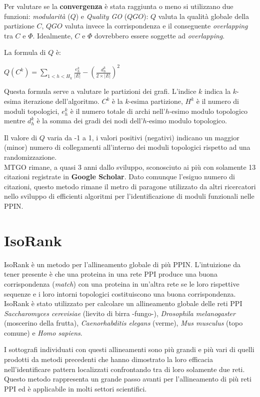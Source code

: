 \documentclass[11pt]{article}
\begin{document}
Per valutare se la \textbf{convergenza} è stata raggiunta o meno si utilizzano due funzioni: \textit{modularità} ($Q$) e \textit{Quality GO} ($QGO$): $Q$ valuta la qualità globale della partizione $C$, $QGO$ valuta invece la corrispondenza e il conseguente \textit{overlapping} tra $C$ e $\Phi$. Idealmente, $C$ e $\Phi$ dovrebbero essere soggette ad \textit{overlapping}.

La formula di $Q$ è:

\begin{center}
$Q(C^k) = \displaystyle{\sum_{1<h<H_k}\frac{e^k_h}{|E|} - \left(\frac{d^k_h}{2 \times |E|}\right)^2}$
\end{center}

Questa formula serve a valutare le partizioni dei grafi. L'indice $k$ indica la $k$-esima iterazione dell'algoritmo. $C^k$ è la $k$-esima partizione, $H^k$ è il numero di moduli topologici, $e^k_h$ è il numero totale di archi nell'$h$-esimo modulo topologico mentre $d^k_h$ è la somma dei gradi dei nodi dell'$h$-esimo modulo topologico. 

Il valore di $Q$ varia da -1 a 1, i valori positivi (negativi) indicano un maggior (minor) numero di collegamenti all'interno dei moduli topologici rispetto ad una randomizzazione.\\

MTGO rimane, a quasi 3 anni dallo sviluppo, sconosciuto ai più con solamente 13 citazioni registrate in \textbf{Google Scholar}. Dato comunque l'esiguo numero di citazioni, questo metodo rimane il metro di paragone utilizzato da altri ricercatori nello sviluppo di efficienti algoritmi per l'identificazione di moduli funzionali nelle PPIN.

\pagebreak
\section{IsoRank}
IsoRank è un metodo per l'allineamento globale di più PPIN. L'intuizione da tener presente è che una proteina in una rete PPI produce una buona corrispondenza (\textit{match}) con una proteina in un'altra rete se le loro rispettive sequenze e i loro intorni topologici costituiscono una buona corrispondenza. IsoRank è stato utilizzato per calcolare un allineamento globale delle reti PPI \textit{Saccharomyces cerevisiae} (lievito di birra -fungo-), \textit{Drosophila melanogaster} (moscerino della frutta), \textit{Caenorhabditis elegans} (verme), \textit{Mus musculus} (topo comune) e \textit{Homo sapiens}.

I sottografi individuati con questi allineamenti sono più grandi e più vari di quelli prodotti da metodi precedenti che hanno dimostrato la loro efficacia nell'identificare pattern localizzati confrontando tra di loro solamente due reti. Questo metodo rappresenta un grande passo avanti per l'allineamento di più reti PPI ed è applicabile in molti settori scientifici.
\end{document}
